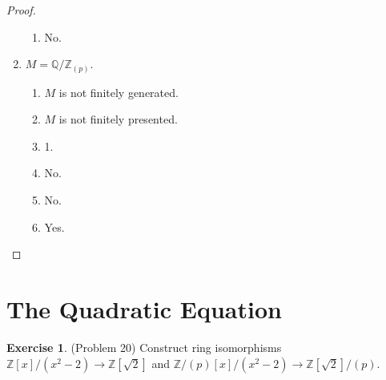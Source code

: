 \documentclass[12pt, psamsfonts]{amsart}
\theoremstyle{definition}
\newtheorem*{exer}{Exercise}
\theoremstyle{remark}
\numberwithin{equation}{section}
\begin{document}
\begin{proof}
\begin{enumerate}[label=(\alph*)]
\begin{enumerate}[label=(\roman*)]
        \item
          No.
      \end{enumerate}
    \item 
      $M = \mathbb{Q} / \mathbb{Z}_{(p)}$.
      \begin{enumerate}[label=(\roman*)]
        \item 
          $M$ is not finitely generated.
        \item
          $M$ is not finitely presented.
        \item
          1.
        \item
          No.
        \item
          No.
        \item
          Yes.
      \end{enumerate}
  \end{enumerate}
\end{proof}

\section{The Quadratic Equation}

\begin{exer}{(Problem 20)}
  Construct ring isomorphisms $\mathbb{Z}[x]/(x^2 - 2) \rightarrow \mathbb{Z}[\sqrt{2}]$ and $\mathbb{Z}/(p)[x]/(x^2 - 2) \rightarrow \mathbb{Z}[\sqrt{2}]/(p)$.
\end{exer}
\end{document}
